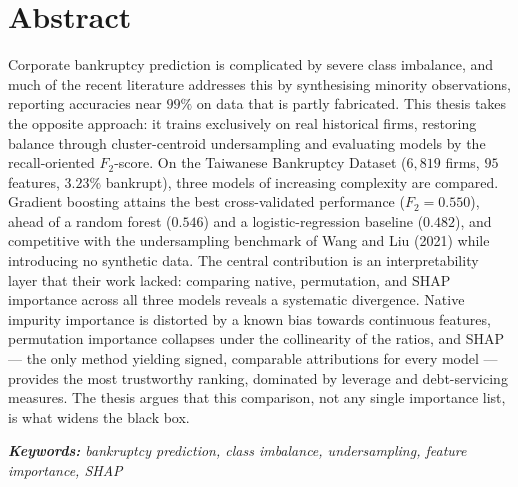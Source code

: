 \chapter*{Abstract}
\noindent
Corporate bankruptcy prediction is complicated by severe class imbalance, and
much of the recent literature addresses this by synthesising minority
observations, reporting accuracies near $99\%$ on data that is partly fabricated.
This thesis takes the opposite approach: it trains exclusively on real
historical firms, restoring balance through cluster-centroid undersampling and
evaluating models by the recall-oriented $F_2$-score. On the Taiwanese
Bankruptcy Dataset ($6{,}819$ firms, $95$ features, $3.23\%$ bankrupt), three
models of increasing complexity are compared. Gradient boosting attains the best
cross-validated performance ($F_2 = 0.550$), ahead of a random forest ($0.546$)
and a logistic-regression baseline ($0.482$), and competitive with the
undersampling benchmark of Wang and Liu (2021) while introducing no synthetic
data. The central contribution is an interpretability layer that their work
lacked: comparing native, permutation, and SHAP importance across all three
models reveals a systematic divergence. Native impurity importance is distorted
by a known bias towards continuous features, permutation importance collapses
under the collinearity of the ratios, and SHAP --- the only method yielding
signed, comparable attributions for every model --- provides the most
trustworthy ranking, dominated by leverage and debt-servicing measures. The
thesis argues that this comparison, not any single importance list, is what
widens the black box.

\vspace{1em}
\noindent\textit{\textbf{Keywords: }bankruptcy prediction, class imbalance,
undersampling, feature importance, SHAP}
